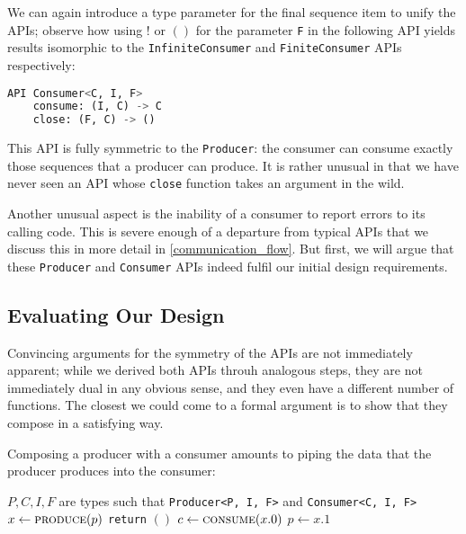 \documentclass[sigplan,screen,10pt,anonymous,review]{acmart}
\begin{document}
We can again introduce a type parameter for the final sequence item to unify the APIs; observe how using $!$ or $()$ for the parameter \texttt{F} in the following API yields results isomorphic to the \texttt{InfiniteConsumer} and \texttt{FiniteConsumer} APIs respectively:

\begin{lstlisting}[language=Python]
API Consumer<C, I, F>
    consume: (I, C) -> C
    close: (F, C) -> ()
\end{lstlisting}

This API is fully symmetric to the \texttt{Producer}: the consumer can consume exactly those sequences that a producer can produce. It is rather unusual in that we have never seen an API whose \texttt{close} function takes an argument in the wild.

Another unusual aspect is the inability of a consumer to report errors to its calling code. This is severe enough of a departure from typical APIs that we discuss this in more detail in \cref{communication_flow}. But first, we will argue that these \texttt{Producer} and \texttt{Consumer} APIs indeed fulfil our initial design requirements.

\subsection{Evaluating Our Design}\label{evaluating_ours}

Convincing arguments for the symmetry of the APIs are not immediately apparent; while we derived both APIs throuh analogous steps, they are not immediately dual in any obvious sense, and they even have a different number of functions. The closest we could come to a formal argument is to show that they compose in a satisfying way.

Composing a producer with a consumer amounts to piping the data that the producer produces into the consumer:

\begin{algorithmic}
\Require $P, C, I, F$ are types such that \texttt{Producer<P, I, F>} and \texttt{Consumer<C, I, F>}
    \Loop
        \State $x \gets \Call{produce}{p}$
            \State {}
            \State \texttt{return} $()$
        \Else
            \State $c \gets \Call{consume}{x.0}$
            \State $p \gets x.1$
        \EndIf
    \EndLoop
\EndProcedure
\end{algorithmic}
\end{document}
